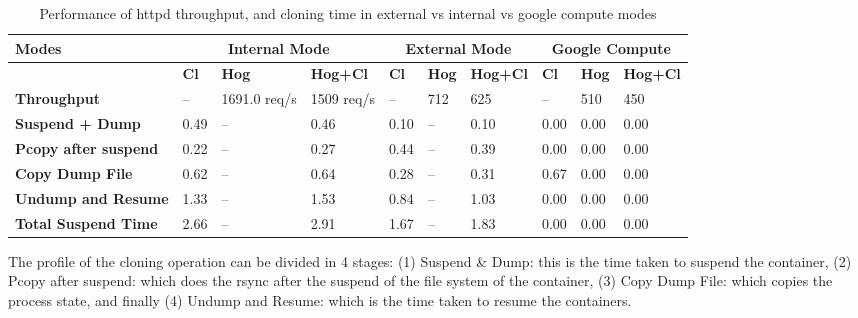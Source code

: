 \begin{table}[ht]
  \centering
    \begin{tabular}{ | p{4cm} | l | l | l | l | l | l | l | l | l |}
    \hline
    \textbf{Modes} & \multicolumn{3}{|c|}{\textbf{Internal Mode}} & \multicolumn{3}{|c|}{\textbf{External Mode}} & \multicolumn{3}{|c|}{\textbf{Google Compute}}\\\hline
    \textbf{ } & \textbf{Cl} & \textbf{Hog} & \textbf{Hog+Cl} & \textbf{Cl} & \textbf{Hog} & \textbf{Hog+Cl} & \textbf{Cl} & \textbf{Hog} & \textbf{Hog+Cl} \\ \hline
    \hline
    \textbf{Throughput} & -- & 1691.0 req/s & 1509 req/s & -- & 712 & 625 & -- & 510 & 450\\ \hline
    \hline
    \textbf{Suspend + Dump} & 0.49 & -- & 0.46 & 0.10 & -- & 0.10 & 0.00 & 0.00 & 0.00\\ \hline
    \textbf{Pcopy after suspend} & 0.22 & -- & 0.27 & 0.44 & -- & 0.39 & 0.00 & 0.00 & 0.00\\ \hline
    \textbf{Copy Dump File} & 0.62 &  -- & 0.64 & 0.28 & -- & 0.31 & 0.67 & 0.00 & 0.00\\ \hline
    \textbf{Undump and Resume} & 1.33 &  -- & 1.53 & 0.84 & -- & 1.03 & 0.00 & 0.00 & 0.00\\ \hline 
    \hline
    \textbf{Total Suspend Time} & 2.66 &  -- & 2.91 & 1.67 & -- & 1.83 & 0.00 & 0.00 & 0.00\\ \hline
    \end{tabular}
    \captionsetup{justification=centering}
	\caption{Performance of httpd throughput, and cloning time in external vs internal vs google compute modes}
	\label{table:clonePerf}
\end{table}
\fi

The profile of the cloning operation can be divided in 4 stages: 
(1) Suspend \& Dump: this is the time taken to suspend the container, 
(2) Pcopy after suspend: which does the rsync after the suspend of the file system of the container, 
(3) Copy Dump File: which copies the process state, and finally 
(4) Undump and Resume: which is the time taken to resume the containers. 



